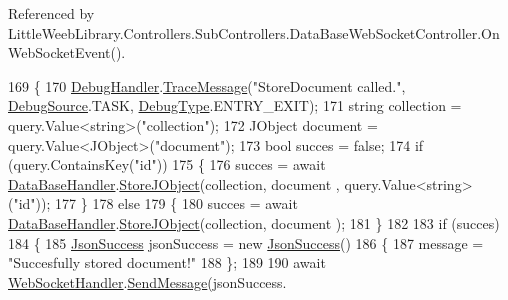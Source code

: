 Referenced by Little\+Weeb\+Library.\+Controllers.\+Sub\+Controllers.\+Data\+Base\+Web\+Socket\+Controller.\+On\+Web\+Socket\+Event().


\begin{DoxyCode}
169         \{
170             \mbox{\hyperlink{class_little_weeb_library_1_1_handlers_1_1_debug_handler}{DebugHandler}}.\mbox{\hyperlink{class_little_weeb_library_1_1_handlers_1_1_debug_handler_afccb37dfd6b2114af72000c2f4fe4607}{TraceMessage}}(\textcolor{stringliteral}{"StoreDocument called."}, 
      \mbox{\hyperlink{namespace_little_weeb_library_1_1_handlers_a2a6ca0775121c9c503d58aa254d292be}{DebugSource}}.TASK, \mbox{\hyperlink{namespace_little_weeb_library_1_1_handlers_ab66019ed40462876ec4e61bb3ccb0a62}{DebugType}}.ENTRY\_EXIT);
171             \textcolor{keywordtype}{string} collection = query.Value<\textcolor{keywordtype}{string}>(\textcolor{stringliteral}{"collection"});
172             JObject document = query.Value<JObject>(\textcolor{stringliteral}{"document"});
173             \textcolor{keywordtype}{bool} succes = \textcolor{keyword}{false};
174             \textcolor{keywordflow}{if} (query.ContainsKey(\textcolor{stringliteral}{"id"}))
175             \{
176                 succes = await \mbox{\hyperlink{class_little_weeb_library_1_1_handlers_1_1_data_base_handler}{DataBaseHandler}}.\mbox{\hyperlink{class_little_weeb_library_1_1_handlers_1_1_data_base_handler_a5e6a70ef81b049da46b6ae3a15b09cd3}{StoreJObject}}(collection, document
      , query.Value<\textcolor{keywordtype}{string}>(\textcolor{stringliteral}{"id"}));
177             \}
178             \textcolor{keywordflow}{else}
179             \{
180                 succes = await \mbox{\hyperlink{class_little_weeb_library_1_1_handlers_1_1_data_base_handler}{DataBaseHandler}}.\mbox{\hyperlink{class_little_weeb_library_1_1_handlers_1_1_data_base_handler_a5e6a70ef81b049da46b6ae3a15b09cd3}{StoreJObject}}(collection, document
      );
181             \}
182 
183             \textcolor{keywordflow}{if} (succes)
184             \{
185                 \mbox{\hyperlink{class_little_weeb_library_1_1_models_1_1_json_success}{JsonSuccess}} jsonSuccess = \textcolor{keyword}{new} \mbox{\hyperlink{class_little_weeb_library_1_1_models_1_1_json_success}{JsonSuccess}}()
186                 \{
187                     message = \textcolor{stringliteral}{"Succesfully stored document!"}
188                 \};
189 
190                 await \mbox{\hyperlink{class_little_weeb_library_1_1_handlers_1_1_web_socket_handler}{WebSocketHandler}}.\mbox{\hyperlink{class_little_weeb_library_1_1_handlers_1_1_web_socket_handler_a1de289d54d665a32c93478c68d3e6ad0}{SendMessage}}(jsonSuccess.

\end{DoxyCode}
